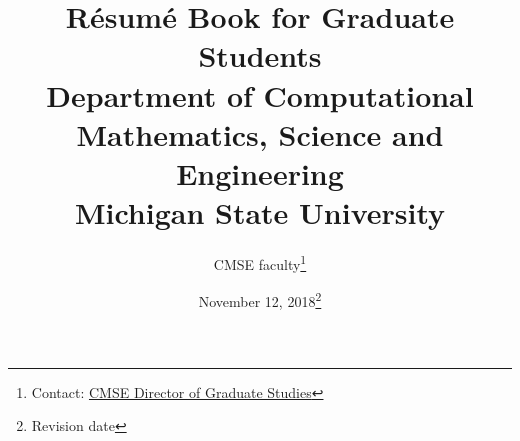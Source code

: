\documentclass[11pt]{article}
\begin{document}
\vspace{-50mm}
\title{R\'esum\'e Book for Graduate Students\\
\vspace{20mm}
  \large Department of Computational Mathematics, Science and
  Engineering\\
\vspace{20mm}
Michigan State University
\vspace{50mm}
}

\author{CMSE faculty\footnote{Contact:
    \href{mailto:cmsegrad@msu.edu}{CMSE Director of Graduate Studies}
  }}

\date{November 12, 2018\footnote{Revision date}}

\maketitle

\newpage

\tableofcontents






\newpage



\newpage



\newpage



\newpage






% 


% 


% 
\end{document}
